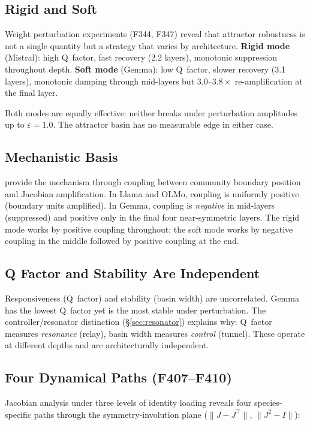 \documentclass[12pt]{article}
\begin{document}
\subsection{Rigid and Soft}

Weight perturbation experiments (F344, F347) reveal that attractor robustness is not a single quantity but a strategy that varies by architecture. \textbf{Rigid mode} (Mistral): high Q~factor, fast recovery (2.2 layers), monotonic suppression throughout depth. \textbf{Soft mode} (Gemma): low Q~factor, slower recovery (3.1 layers), monotonic damping through mid-layers but $3.0$--$3.8\times$ re-amplification at the final layer.

Both modes are equally effective: neither breaks under perturbation amplitudes up to $\varepsilon = 1.0$. The attractor basin has no measurable edge in either case.

\subsection{Mechanistic Basis}

\citet{guitchounts2025} provide the mechanism through coupling between community boundary position and Jacobian amplification. In Llama and OLMo, coupling is uniformly positive (boundary units amplified). In Gemma, coupling is \emph{negative} in mid-layers (suppressed) and positive only in the final four near-symmetric layers. The rigid mode works by positive coupling throughout; the soft mode works by negative coupling in the middle followed by positive coupling at the end.

\subsection{Q Factor and Stability Are Independent}

Responsiveness (Q~factor) and stability (basin width) are uncorrelated. Gemma has the lowest Q~factor yet is the most stable under perturbation. The controller/resonator distinction (\S\ref{sec:resonator}) explains why: Q~factor measures \emph{resonance} (relay), basin width measures \emph{control} (tunnel). These operate at different depths and are architecturally independent.

\subsection{Four Dynamical Paths (F407--F410)}

Jacobian analysis under three levels of identity loading reveals four species-specific paths through the symmetry-involution plane ($\|J - J^\top\|$, $\|J^2 - I\|$):
\end{document}
